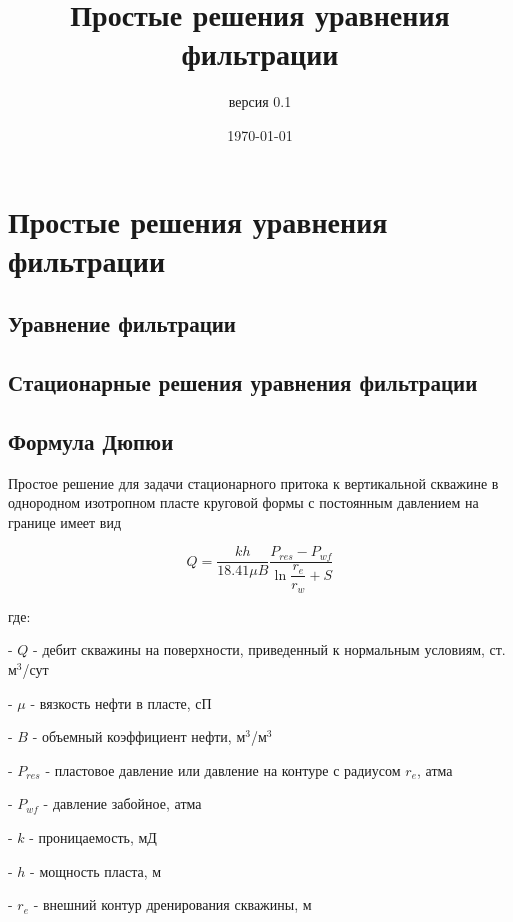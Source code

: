 \documentclass[oneside, openany]{memoir}
\author{версия 0.1}
\title{Простые решения уравнения фильтрации}
\date{\today}
\begin{document}
	
	\maketitle
	
	\chapter{Простые решения уравнения фильтрации}
	
	\section{Уравнение фильтрации}
	
	
	
	
	\section{Стационарные решения уравнения фильтрации}
	
	
	
	
	\section{Формула Дюпюи}
	
	Простое решение для задачи стационарного притока к вертикальной скважине в однородном изотропном пласте круговой формы с постоянным давлением на границе имеет вид
	
	\begin{equation}
		Q=\dfrac{kh}{18.41\mu B} \dfrac{P_{res}-P_{wf}}{\ln \dfrac{r_e}{r_w} + S} 
	\end{equation}
	
	
	где: 
	
	- $Q$ - дебит скважины на поверхности, приведенный к нормальным условиям, ст. м$^3$/сут
	
	- $\mu$ - вязкость нефти в пласте, сП
	
	- $B$ - объемный коэффициент нефти, м$^3$/м$^3$
	
	- $P_{res}$ - пластовое давление или давление на контуре с радиусом $r_e$, атма
	
	- $P_{wf}$ - давление забойное, атма
	
	- $k$ - проницаемость, мД
	
	- $h$ - мощность пласта, м
	
	- $r_e$ - внешний контур дренирования скважины, м
	
\end{document}
